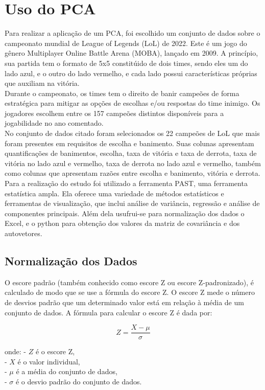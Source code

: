\documentclass[a4paper,12pt]{article}
\begin{document}
\section{Uso do PCA}
Para realizar a aplicação de um PCA, foi escolhido um conjunto de dados sobre o campeonato mundial de League of Legends (LoL) de 2022. Este é um jogo do gênero Multiplayer Online Battle Arena (MOBA), lançado em 2009. A princípio, sua partida tem o formato de 5x5 constitúido de dois times, sendo eles um do lado azul, e o outro do lado vermelho, e cada lado possui características próprias que auxiliam na vitória.\\ Durante o campeonato, os times tem o direito de banir campeões de forma estratégica para mitigar as opções de escolhas e/ou respostas do time inimigo. Os jogadores escolhem entre os 157 campeões distintos disponíveis para a jogabilidade no ano comentado.\\No conjunto de dados citado foram selecionados os 22 campeões de LoL que mais foram presentes em requisitos de escolha e banimento. Suas colunas apresentam quantificações de banimentos, escolha, taxa de vitória e taxa de derrota, taxa de vitória no lado azul e vermelho, taxa de derrota no lado azul e vermelho, também como colunas que apresentam razões entre escolha e banimento, vitória e derrota.\\
Para a realização do estudo foi utilizado a ferramenta PAST, uma ferramenta estatística ampla. Ela oferece uma variedade de métodos estatísticos e ferramentas de visualização, que inclui análise de variância, regressão e análise de componentes principais. Além dela usufrui-se para normalização dos dados o Excel, e o python para obtenção dos valores da matriz de covariância e dos autovetores.

\subsection{Normalização dos Dados}
O escore padrão (também conhecido como escore Z ou escore Z-padronizado), é calculado de modo que se use a fórmula do escore Z. O escore Z mede o número de desvios padrão que um determinado valor está em relação à média de um conjunto de dados. A fórmula para calcular o escore Z é dada por:

\[ Z = \frac{{X - \mu}}{{\sigma}} \]

onde:
- \( Z \) é o escore Z,\\
- \( X \) é o valor individual,\\
- \( \mu \) é a média do conjunto de dados,\\
- \( \sigma \) é o desvio padrão do conjunto de dados.\\
\end{document}
